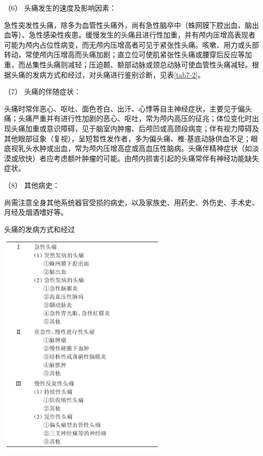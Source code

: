 \hypertarget{text00020.htmlux5cux23CHP1-7-2-1-1-6}{}
（6） 头痛发生的速度及影响因素：

急性突发性头痛，除多为血管性头痛外，尚有急性脑卒中（蛛网膜下腔出血、脑出血等）、急性感染性疾患。缓慢发生的头痛且进行性加重，并有颅内压增高表现者可能为颅内占位性病变，而无颅内压增高者可见于紧张性头痛。咳嗽、用力或头部转动，常使颅内压增高而头痛加剧；直立位可使肌紧张性头痛或腰穿后反应等加重，而丛集性头痛则减轻；压迫颞、额部动脉或颈总动脉可使血管性头痛减轻。根据头痛的发病方式和经过，对头痛进行鉴别诊断，见表\ref{tab7-2}。

\hypertarget{text00020.htmlux5cux23CHP1-7-2-1-1-7}{}
（7） 头痛的伴随症状：

头痛时常伴恶心、呕吐、面色苍白、出汗、心悸等自主神经症状，主要见于偏头痛；头痛严重并有进行性加剧的恶心、呕吐，常为颅内高压的征兆；体位变化时出现头痛加重或意识障碍，见于脑室内肿瘤、后颅凹或高颈段病变；伴有视力障碍及其他眼部征象（复视），呈短暂性发作者，多为偏头痛、椎-基底动脉供血不足；眼底视乳头水肿或出血，常为颅内压增高症或高血压性脑病。头痛伴精神症状（如淡漠或欣快）者应考虑额叶肿瘤的可能。由颅内损害引起的头痛常伴有神经功能缺失症状。

\hypertarget{text00020.htmlux5cux23CHP1-7-2-1-1-8}{}
（8） 其他病史：

尚需注意全身其他系统器官受损的病史，以及家族史、用药史、外伤史、手术史、月经及烟酒嗜好等。

\begin{table}[htbp]
\centering
\caption{头痛的发病方式和经过}
\label{tab7-2}
\includegraphics[width=3.22917in,height=4.33333in]{./images/Image00040.jpg}
\end{table}

